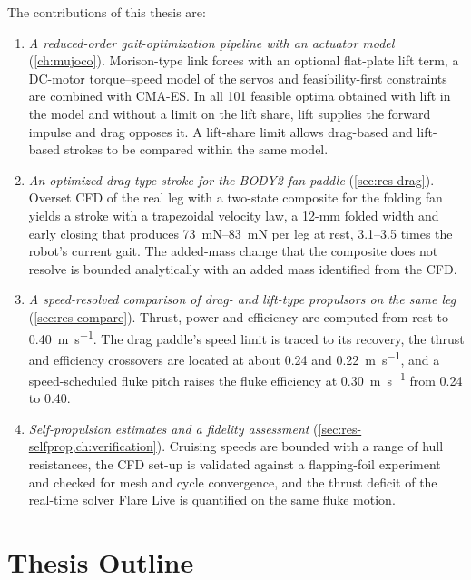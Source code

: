 The contributions of this thesis are:
\begin{enumerate}
  \item \emph{A reduced-order gait-optimization pipeline with an actuator model} (\cref{ch:mujoco}).
        Morison-type link forces with an optional flat-plate lift term, a DC-motor torque--speed model of
        the servos and feasibility-first constraints are combined with CMA-ES. In all 101 feasible optima
        obtained with lift in the model and without a limit on the lift share, lift supplies the forward impulse and drag opposes it. A lift-share limit
        allows drag-based and lift-based strokes to be compared within the same model.
  \item \emph{An optimized drag-type stroke for the BODY2 fan paddle} (\cref{sec:res-drag}). Overset CFD of the
        real leg with a two-state composite for the folding fan yields a stroke with a trapezoidal velocity
        law, a 12-mm folded width and early closing that produces \SIrange{73}{83}{\milli\newton} per leg
        at rest, 3.1--3.5 times the robot's current gait. The added-mass change that the composite does not resolve
        is bounded analytically with an added mass identified from the CFD.
  \item \emph{A speed-resolved comparison of drag- and lift-type propulsors on the same leg}
        (\cref{sec:res-compare}). Thrust, power and efficiency are computed from rest to
        \SI{0.40}{\metre\per\second}. The drag paddle's speed limit is traced to its recovery, the
        thrust and efficiency crossovers are located at about \SI{0.24}{} and \SI{0.22}{\metre\per\second}, and a speed-scheduled
        fluke pitch raises the fluke efficiency at \SI{0.30}{\metre\per\second} from 0.24 to 0.40.
  \item \emph{Self-propulsion estimates and a fidelity assessment} (\cref{sec:res-selfprop,ch:verification}).
        Cruising speeds are bounded with a range of hull resistances, the CFD set-up is validated against
        a flapping-foil experiment and checked for mesh and cycle convergence, and the thrust deficit of
        the real-time solver Flare Live is quantified on the same fluke motion.
\end{enumerate}

\section{Thesis Outline}

